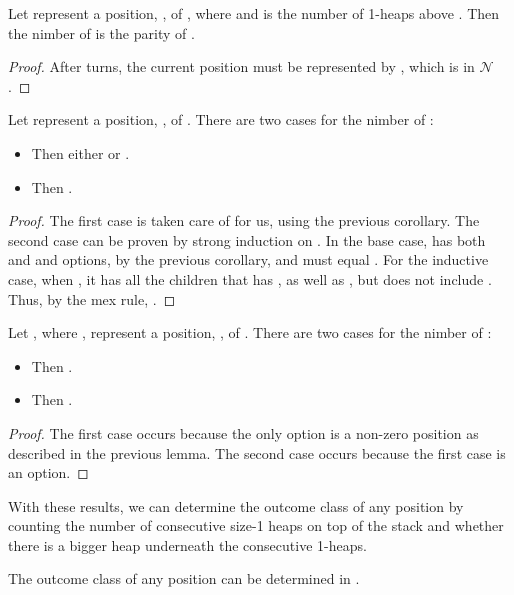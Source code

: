 \documentclass[letter,10pt]{article}
\newcommand{\fuzzy}{\ensuremath{\mathcal{N}}}
\begin{document}
\begin{corollary}
\label{corol:towerOnesOnTop}
	Let  represent a position, , of , where  and  is the number of 1-heaps above .  Then the nimber of  is the parity of .
\end{corollary}
\begin{proof}
	After  turns, the current position must be represented by , which is in \fuzzy.  
\end{proof}

\begin{lemma}
	Let  represent a position, , of .  There are two cases for the nimber of :
	\begin{itemize}
		\item[] Then either  or .
		\item[] Then .
	\end{itemize}
\end{lemma}
\begin{proof}
	The first case is taken care of for us, using the previous corollary.
	The second case can be proven by strong induction on .  In the base case,  has both  and  and options, by the previous corollary, and must equal .  For the inductive case, when , it has all the children that  has , as well as , but does not include .  Thus, by the mex rule, .
\end{proof}

\begin{corollary}
	Let , where , represent a position, , of .  There are two cases for the nimber of :
	\begin{itemize}
		\item[] Then .
		\item[] Then .
	\end{itemize}
\end{corollary}
\begin{proof}
	The first case occurs because the only option is a non-zero position as described in the previous lemma.  The second case occurs because the first case is an option.
\end{proof}

With these results, we can determine the outcome class of any position by counting the number of consecutive size-1 heaps on top of the stack and whether there is a bigger heap underneath the consecutive 1-heaps. 

\begin{corollary}
    The outcome class of any  position can be determined in .
\end{corollary}
\end{document}
